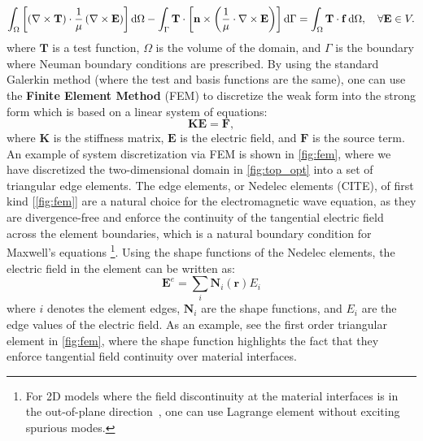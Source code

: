     \begin{equation}
        \int_\Omega \left[ \left( \nabla \times \mathbf{T} \right) \cdot \frac{1}{\mu} \left( \nabla \times \mathbf{E} \right) \right] \mathop{}\!\text{d} \Omega 
        - \int_\Gamma \mathbf{T} \cdot \left[ \mathbf{n} \times \left( \frac{1}{\mu} \cdot \nabla \times \mathbf{E} \right) \right] \mathop{}\!\text{d} \Gamma \\
        = \int_\Omega \mathbf{T} \cdot \mathbf{f} \mathop{}\!\text{d} \Omega,
        \quad \forall \mathbf{E} \in V.
    \end{equation}
where $\mathbf{T}$ is a test function, $\Omega$ is the volume of the domain, and $\Gamma$ is the boundary where Neuman boundary conditions
are prescribed. By using  the standard Galerkin method (where the test and basis functions are the same), one can use the \textbf{Finite Element Method} 
(FEM) to discretize the weak form 
into the strong form which is based on a linear system of equations:
\begin{equation}
    \mathbf{K} \mathbf{E} = \mathbf{F},
\end{equation}
where $\mathbf{K}$ is the stiffness matrix, $\mathbf{E}$ is the electric field, and $\mathbf{F}$ is the source term. 
An example of system discretization via FEM is shown in \autoref{fig:fem},  where we have discretized the two-dimensional 
domain in \autoref{fig:top_opt} into a set of triangular edge elements. The edge elements, or Nedelec elements (CITE), 
of first kind [\autoref{fig:fem}] are a natural choice for the electromagnetic 
wave equation, as they are divergence-free and enforce the continuity of the tangential electric field 
across the element boundaries, which is a natural boundary condition for Maxwell's equations 
\footnote{For 2D models where the field discontinuity at the material interfaces 
is in the out-of-plane direction~\cite{ownpub3}, one can use Lagrange element without 
exciting spurious modes.}. Using the shape functions of the Nedelec elements, the electric field in the element can be written as:
\begin{equation}
    \boldsymbol{E}^e=\sum_i \boldsymbol{N}_i(\mathbf{r}) E_i
\end{equation}
where $i$ denotes the element edges, $\boldsymbol{N}_i$ are the shape functions, and $E_i$ are the edge values of the electric field. As an example,
see the first order triangular element in \autoref{fig:fem}, where the shape function highlights the fact that they enforce tangential field
continuity over material interfaces. 

